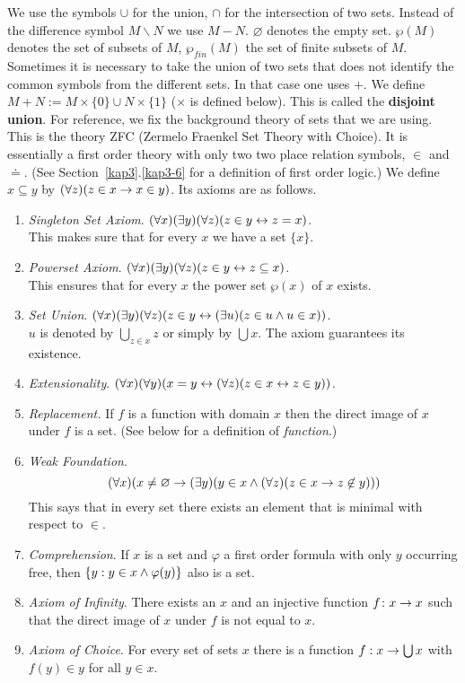 We use the symbols
\index{$\cap$, $\cup$, $-$, $\varnothing$}%
$\cup$ for the union, $\cap$ for the intersection of two sets.
Instead of the difference symbol $M\backslash N$ we use $M - N$.
$\varnothing$ denotes the empty set. $\wp(M)$ denotes the set of
subsets of $M$, $\wp_{fin}(M)$ the set of finite subsets of $M$.
Sometimes it is necessary to take the union of two sets that does
not identify the common symbols from the different sets. In that
case one uses $+$. %
\index{$+$}%
\index{$\in$, $\doteq$, $\subseteq$}%
We define $M + N := M \times \{0\} \cup N \times
\{1\}$ ($\times$ is defined below). This is called the 
\textbf{disjoint union}. For reference, we
fix the background theory of sets that we are using. This is the theory
{\sf ZFC} (Zermelo Fraenkel Set Theory with Choice). It is
essentially a first order theory with only two two place relation
symbols, $\in$ and $\doteq$. (See Section~\ref{kap3}.\ref{kap3-6} for a
definition of first order logic.) We define $x \subseteq y$ 
by $(\forall z)(z \in x \rightarrow x \in y)$. Its axioms are as follows.
\begin{enumerate}
\item {\sl Singleton Set Axiom}.
    $(\forall x)(\exists y)(\forall z)(z \in y
    \leftrightarrow z = x)$.  \\
    This makes sure that for every $x$ we have a set $\{x\}$.
\item {\sl Powerset Axiom}. $(\forall x)(\exists y)(\forall z)(%
    z \in y \dpf z \subseteq x)$. \\
    This ensures that for every $x$ the power set $\wp(x)$
    of $x$ exists.
\item {\sl Set Union}. $(\forall x)(\exists y)(%
    \forall z)(z \in y \dpf (\exists u)(z \in u \und u \in x))$.
    \\
    $u$ is denoted by $\bigcup_{z \in x} z$ or simply by
    $\bigcup x$. The axiom guarantees its existence.
\item {\sl Extensionality}. $(\forall x)(\forall y)(x = y \leftrightarrow
    (\forall z)(z \in x \leftrightarrow z \in y))$.
\item {\sl Replacement.} If $f$ is a function with domain
    $x$ then the direct image of $x$ under $f$ is a set.
    (See below for a definition of {\it function}.)
\item {\sl Weak Foundation}. 
	$$(\forall x)(x \neq \varnothing \rightarrow
    (\exists y)(y \in x \wedge (\forall z)(z \in x \rightarrow
    z \not\in y)))$$
    This says that in every set there exists an element that
    is minimal with respect to $\in$.
\item {\sl Comprehension}. If $x$ is a set and $\varphi$ a
    first order formula with only $y$ occurring free, then 
	$\{y : y \in x \wedge \varphi(y)\}$ also is a set.
\item {\sl Axiom of Infinity}. There exists an $x$ and an injective
    function $f \colon x \rightarrow x$ such that the direct image of
    $x$ under $f$ is not equal to $x$.
\item {\sl Axiom of Choice}. For every set of sets $x$ there
    is a function $f : x \rightarrow \bigcup x$ with
    $f(y) \in y$ for all $y \in x$.
\end{enumerate}
